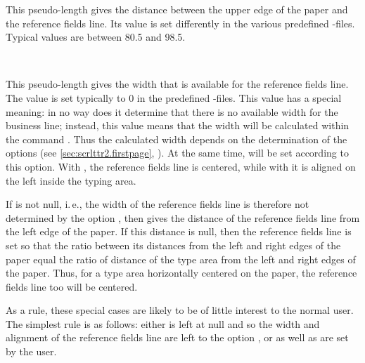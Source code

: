 \begin{Declaration}
\end{Declaration}
%
This pseudo-length gives the distance between the upper edge of the paper and
the reference fields line. Its value is set differently in the various
predefined
-files.
Typical values are between 80.5 and 98.5.
%
%


\begin{Declaration}
  \\
\end{Declaration}
%
%
This pseudo-length gives the width that is available for the reference fields
line.  The value is set typically to 0 in the predefined
-files.
This value has a special meaning: in no way does it
determine that there is no available width for the business line; instead,
this value means that the width will be calculated within the command
. Thus the calculated width depends on the
determination of the options %
 (see
\autoref{sec:scrlttr2.firstpage},
). At the same time,
 will be set according to this option. With
, the reference
fields line is centered, while with
 it is
aligned on the left inside the typing area.

If  is not null, i.\,e., the width of the reference fields
line is therefore not determined by the option , then
 gives the distance of the reference fields line from the
left edge of the paper. If this distance is null, then
the reference fields line is set so that the ratio between its distances from
the left and right edges of the paper equal the ratio of distance of the type
area from the left and right edges of the paper. Thus, for a type area
horizontally centered on the paper, the reference fields line too will be
centered.

As a rule, these special cases are likely to be of little interest to the
normal user. The simplest rule is as follows: either
 is left at null and so the width and alignment of the
reference fields line are left to the option , or
 as well as  are set by the user.%
%
%
%


